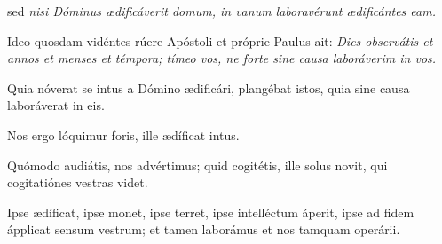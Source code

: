 {\noindent sed \emph{nisi Dóminus ædificáverit domum, in vanum laboravérunt ædificántes eam.}

\noindent Ideo quosdam vidéntes rúere Apóstoli et próprie Paulus ait: \emph{Dies observátis et annos et menses et témpora; tímeo vos, ne forte sine causa laboráverim in vos.}

\noindent Quia nóverat se intus a Dómino ædificári, plangébat istos, quia sine causa laboráverat in eis.

\noindent Nos ergo lóquimur foris, ille ædíficat intus.

\noindent Quómodo audiátis, nos advértimus; quid cogitétis, ille solus novit, qui cogitatiónes vestras videt.

\noindent Ipse ædíficat, ipse monet, ipse terret, ipse intelléctum áperit, ipse ad fidem ápplicat sensum vestrum; et tamen laborámus et nos tamquam operárii.}
\newcommand{\responsoriumiii}{\pars{Responsorium 3.} \scriptura{\Rbardot{} 1 Reg. 8, 28.29 \Vbardot{} Dt. 27, 15; \textbf{H396}}

\vspace{-5mm}

\responsorium{I}{temporalia/resp-audidominehymnum-CROCHU-cumdox.gtex}{}}



